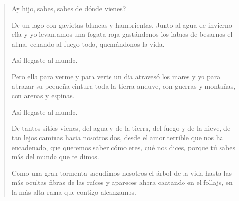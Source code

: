\documentclass[12pt]{article}
\begin{document}
\clearpage
{}
\begin{verse}
Ay hijo, sabes, sabes  
de dónde vienes?  

De un lago con gaviotas  
blancas y hambrientas.  
Junto al agua de invierno  
ella y yo levantamos  
una fogata roja  
gastándonos los labios  
de besarnos el alma,  
echando al fuego todo,  
quemándonos la vida.  

Así llegaste al mundo.  

Pero ella para verme  
y para verte un día  
atravesó los mares  
y yo para abrazar  
su pequeña cintura  
toda la tierra anduve,  
con guerras y montañas,  
con arenas y espinas.  

Así llegaste al mundo.  

De tantos sitios vienes,  
del agua y de la tierra,  
del fuego y de la nieve,  
de tan lejos caminas  
hacia nosotros dos,  
desde el amor terrible  
que nos ha encadenado,  
que queremos saber  
cómo eres, qué nos dices,  
porque tú sabes más  
del mundo que te dimos.  

Como una gran tormenta  
sacudimos nosotros  
el árbol de la vida  
hasta las más ocultas  
fibras de las raíces  
y apareces ahora  
cantando en el follaje,  
en la más alta rama  
que contigo alcanzamos.  

\end{verse}
\end{document}
